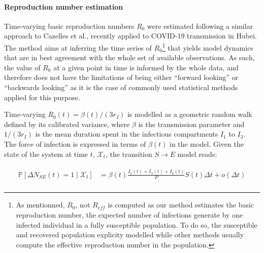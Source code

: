  \paragraph{Reproduction number estimation} Time-varying basic reproduction numbers $R_0$ were estimated following a similar approach to Cazelles et al.\cite{Cazelles:AccountingNonstationarityEpidemiology:2018}, recently applied to COVID-19 transmission in Hubei\cite{Kucharski:EarlyDynamicsTransmission:2020}. The method aims at inferring the time series of $R_0$\footnote{As mentionned, $R_0$, not $R_{eff}$ is computed as our method estimates the basic reproduction number, \ie the expected number of infections generate by one infected individual in a fully susceptible population. To do so, the susceptible and recovered population explicity modelled  while other methods usually compute the effective reproduction number in the population.} that yields model dynamics that are in best agreement with the whole set of available observations. As such, the value of $R_0$ at a given point in time is informed by the whole data, and therefore does not have the limitations of being either “forward looking” or “backwards looking” as it is the case of commonly used statistical methods applied for this purpose\cite{Wallinga:DifferentEpidemicCurves:2004,Cori:NewFrameworkSoftware:2013}. 

Time-varying $R_0(t) = \beta(t)/(3r_I)$ is modelled as a geometric random walk defined by its calibrated variance, where $\beta$ is the transmission parameter and $1/(3r_I)$ is the mean duration spent in the infectious compartments $I_1$ to $I_3$. The force of infection is expressed in terms of $\beta(t)$ in the model. Given the state of the system at time \(t\), \(\mathcal{X}_t\), the transition $S \longrightarrow E$ model reads:

\begin{gather}
\label{eq:stochsys}
\begin{aligned}
    \mathbb{P}\left[ \Delta N_{SE}(t) = 1 \mid\mathcal{X}_t\right] &=  \beta(t)  \frac{I_1(t) + I_2(t) + I_3(t)}{P} S(t) \Delta t + o(\Delta t)\\
    \end{aligned}
\end{gather}


